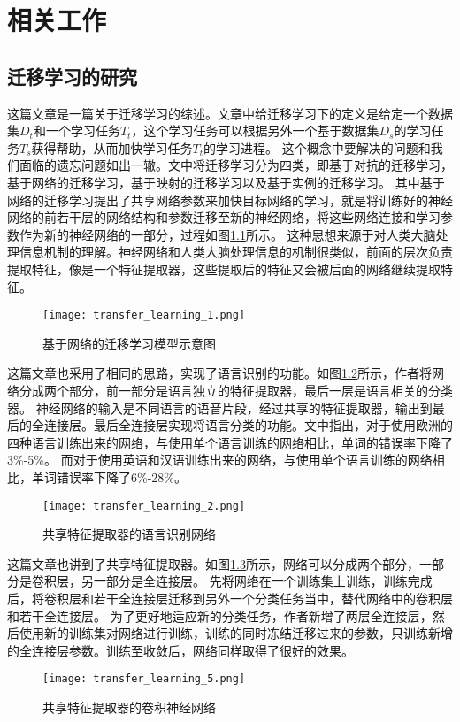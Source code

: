 
\chapter{相关工作}
\section{迁移学习的研究}

这篇文章\cite{10.1007/978-3-030-01424-7_27}是一篇关于迁移学习的综述。文章中给迁移学习下的定义是给定一个数据集$D_t$和一个学习任务$T_t$，这个学习任务可以根据另外一个基于数据集$D_s$的学习任务$T_s$获得帮助，从而加快学习任务$T_t$的学习进程。
这个概念中要解决的问题和我们面临的遗忘问题如出一辙。文中将迁移学习分为四类，即基于对抗的迁移学习，基于网络的迁移学习，基于映射的迁移学习以及基于实例的迁移学习。
其中基于网络的迁移学习提出了共享网络参数来加快目标网络的学习，就是将训练好的神经网络的前若干层的网络结构和参数迁移至新的神经网络，将这些网络连接和学习参数作为新的神经网络的一部分，过程如图\ref{fig:transfer_learning_1}所示。
这种思想来源于对人类大脑处理信息机制的理解。神经网络和人类大脑处理信息的机制很类似，前面的层次负责提取特征，像是一个特征提取器，这些提取后的特征又会被后面的网络继续提取特征。
\begin{figure}
    \centering
    \texttt{[image: transfer\_learning\_1.png]}
    \caption{基于网络的迁移学习模型示意图\cite{10.1007/978-3-030-01424-7_27}}
    \label{fig:transfer_learning_1}
\end{figure}

这篇文章\cite{6639081}也采用了相同的思路，实现了语言识别的功能。如图\ref{fig:transfer_learning_2}所示，作者将网络分成两个部分，前一部分是语言独立的特征提取器，最后一层是语言相关的分类器。
神经网络的输入是不同语言的语音片段，经过共享的特征提取器，输出到最后的全连接层。最后全连接层实现将语言分类的功能。文中指出，对于使用欧洲的四种语言训练出来的网络，与使用单个语言训练的网络相比，单词的错误率下降了3\%-5\%。
而对于使用英语和汉语训练出来的网络，与使用单个语言训练的网络相比，单词错误率下降了6\%-28\%。
\begin{figure}
    \centering
    \texttt{[image: transfer\_learning\_2.png]}
    \caption{共享特征提取器的语言识别网络\cite{6639081}}
    \label{fig:transfer_learning_2}
\end{figure}

这篇文章\cite{Oquab_2014_CVPR}也讲到了共享特征提取器。如图\ref{fig:transfer_learning_5}所示，网络可以分成两个部分，一部分是卷积层，另一部分是全连接层。
先将网络在一个训练集上训练，训练完成后，将卷积层和若干全连接层迁移到另外一个分类任务当中，替代网络中的卷积层和若干全连接层。
为了更好地适应新的分类任务，作者新增了两层全连接层，然后使用新的训练集对网络进行训练，训练的同时冻结迁移过来的参数，只训练新增的全连接层参数。训练至收敛后，网络同样取得了很好的效果。 
\begin{figure}
    \centering
    \texttt{[image: transfer\_learning\_5.png]}
    \caption{共享特征提取器的卷积神经网络\cite{Oquab_2014_CVPR}}
    \label{fig:transfer_learning_5}
\end{figure}

